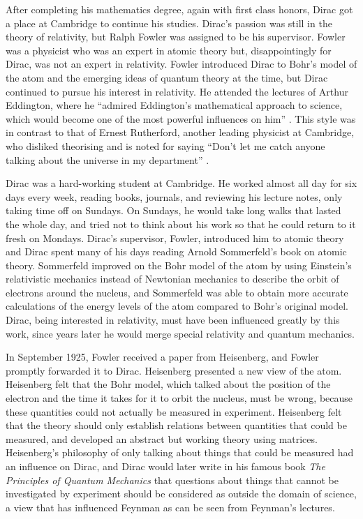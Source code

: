 \documentclass[12pt, oneside, letterpaper, fleqn]{article}
\begin{document}
After completing his mathematics degree, again with first class honors,
Dirac got a place at Cambridge to continue his studies. Dirac's passion
was still in the theory of relativity, but Ralph Fowler was assigned to
be his supervisor. Fowler was a physicist who was an expert in atomic
theory but, disappointingly for Dirac, was not an expert in relativity.
Fowler introduced Dirac to Bohr's model of the atom and the emerging
ideas of quantum theory at the time, but Dirac continued to pursue his
interest in relativity. He attended the lectures of Arthur Eddington,
where he ``admired Eddington's mathematical approach to science, which
would become one of the most powerful influences on him'' \cite[pg.
61]{strangest_man}. This style was in contrast to that of Ernest
Rutherford, another leading physicist at Cambridge, who disliked
theorising and is noted for saying ``Don't let me catch anyone talking
about the universe in my department'' \cite[pg. 61]{strangest_man}.

Dirac was a hard-working student at Cambridge. He worked almost all day
for six days every week, reading books, journals, and reviewing his
lecture notes, only taking time off on Sundays. On Sundays, he would
take long walks that lasted the whole day, and tried not to think about
his work so that he could return to it fresh on Mondays. Dirac's
supervisor, Fowler, introduced him to atomic theory and Dirac spent many
of his days reading Arnold Sommerfeld's book on atomic theory.
Sommerfeld improved on the Bohr model of the atom by using Einstein's
relativistic mechanics instead of Newtonian mechanics to describe the
orbit of electrons around the nucleus, and Sommerfeld was able to obtain
more accurate calculations of the energy levels of the atom compared to
Bohr's original model. Dirac, being interested in relativity, must have
been influenced greatly by this work, since years later he would
merge special relativity and quantum mechanics.

In September 1925, Fowler received a paper from Heisenberg, and Fowler
promptly forwarded it to Dirac. Heisenberg presented a new view of the
atom. Heisenberg felt that the Bohr model, which talked about the
position of the electron and the time it takes for it to orbit the
nucleus, must be wrong, because these quantities could not actually be
measured in experiment. Heisenberg felt that the theory should only
establish relations between quantities that could be measured, and
developed an abstract but working theory using matrices. Heisenberg's
philosophy of only talking about things that could be measured had an
influence on Dirac, and Dirac would later write in his famous book
\textit{The Principles of Quantum Mechanics} \cite{principles} that
questions about things that cannot be investigated by experiment should
be considered as outside the domain of science, a view that has
influenced Feynman as can be seen from Feynman's lectures.
\end{document}
